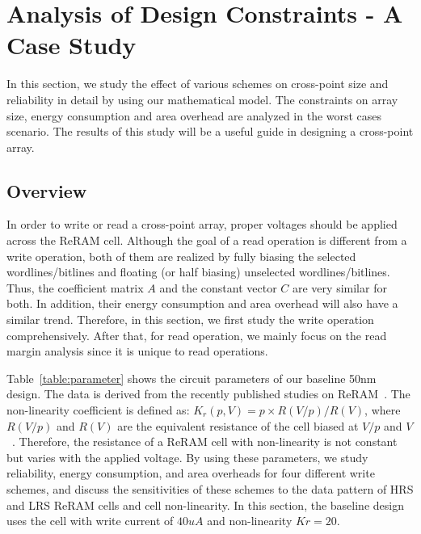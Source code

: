 \vspace{-4pt}
\section{Analysis of Design Constraints - A Case Study}\label{sec:w_and_r}

In this section, we study the effect of various schemes on cross-point
size and reliability in detail by using our mathematical model. The
constraints on array size, energy consumption and area overhead are
analyzed in the worst cases scenario. The results of this study will be a
useful guide in designing a cross-point array.

\vspace{-10pt}
\subsection{Overview}
In order to write or read a cross-point array, proper voltages should be
applied across the ReRAM cell. Although the goal of a read operation is
different from a write operation, both of them are realized by fully
biasing the selected wordlines/bitlines and floating (or half biasing)
unselected wordlines/bitlines. Thus, the coefficient matrix $A$ and the
constant vector $C$ are very similar for both. In addition, their energy
consumption and area overhead will also have a similar trend. Therefore,
in this section, we first study the write operation comprehensively. After
that, for read operation, we mainly focus on the read margin analysis
since it is unique to read operations.

Table~\ref{table:parameter} shows the circuit parameters of our baseline
50nm design. The data is derived from the recently published studies on
ReRAM~\cite{ReRAM_overview,memristor:Cong,ReRAM_Renesas}. The
non-linearity coefficient is defined as: $K_r(p,V) = p \times
R(V/p)/R(V)$, where $R(V/p)$ and $R(V)$ are the equivalent resistance of
the cell biased at $V/p$ and $V$~\cite{memristor:Cong}. Therefore, the
resistance of a ReRAM cell with non-linearity is not constant but varies
with the applied voltage. By using these parameters, we study reliability,
energy consumption, and area overheads for four different write schemes,
and discuss the sensitivities of these schemes to the data pattern of HRS
and LRS ReRAM cells and cell non-linearity. In this section, the baseline
design uses the cell with write current of $40 uA$ and non-linearity
$Kr=20$.

